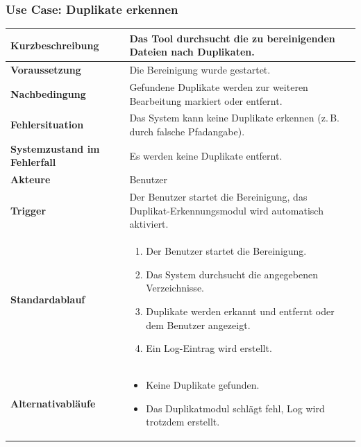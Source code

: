 \subsubsection*{Use Case: Duplikate erkennen}
\begin{tabular}{|p{5cm}|p{10cm}|}
\hline
\textbf{Kurzbeschreibung} & Das Tool durchsucht die zu bereinigenden Dateien nach Duplikaten. \\
\hline
\textbf{Voraussetzung} & Die Bereinigung wurde gestartet. \\
\hline
\textbf{Nachbedingung} & Gefundene Duplikate werden zur weiteren Bearbeitung markiert oder entfernt. \\
\hline
\textbf{Fehlersituation} & Das System kann keine Duplikate erkennen (z.\,B. durch falsche Pfadangabe). \\
\hline
\textbf{Systemzustand im Fehlerfall} & Es werden keine Duplikate entfernt. \\
\hline
\textbf{Akteure} & Benutzer \\
\hline
\textbf{Trigger} & Der Benutzer startet die Bereinigung, das Duplikat-Erkennungsmodul wird automatisch aktiviert. \\
\hline
\textbf{Standardablauf} &
\begin{enumerate}
    \item Der Benutzer startet die Bereinigung.
    \item Das System durchsucht die angegebenen Verzeichnisse.
    \item Duplikate werden erkannt und entfernt oder dem Benutzer angezeigt.
    \item Ein Log-Eintrag wird erstellt.
\end{enumerate}
\\
\hline
\textbf{Alternativabläufe} &
\begin{itemize}
    \item Keine Duplikate gefunden.
    \item Das Duplikatmodul schlägt fehl, Log wird trotzdem erstellt.
\end{itemize}
\\
\hline
\end{tabular}

\vspace{1cm}

